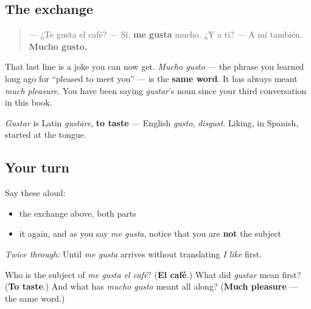 \subsection*{The exchange}
\begin{quote}
— ¿Te gusta el café? — Sí, \textbf{me gusta} mucho. ¿Y a ti? — A mí también. \textbf{Mucho gusto.}
\end{quote}

That last line is a joke you can now get. \emph{Mucho gusto} — the phrase you learned long ago for \textquotedblleft{}pleased to meet you\textquotedblright{} — is the \textbf{same word}. It has always meant \emph{much pleasure}. You have been saying \emph{gustar}'s noun since your third conversation in this book.

\begin{grammarlens}[title={What you've built}]
\emph{Gustar} is Latin \emph{gustāre}, \textbf{to taste} — English \emph{gusto}, \emph{disgust}. Liking, in Spanish, started at the tongue.
\end{grammarlens}

\subsection*{Your turn}
Say these aloud:

\begin{itemize}
\raggedright
  \item the exchange above, both parts
  \item it again, and as you say \emph{me gusta}, notice that you are \textbf{not} the subject
\end{itemize}

\emph{Twice through:} Until \emph{me gusta} arrives without translating \emph{I like} first.

\begin{tcolorbox}[breakable,colback=teal!4,colframe=teal!35!black,title={Before you move on}]
Who is the subject of \emph{me gusta el café}? (\textbf{El café}.) What did \emph{gustar} mean first? (\textbf{To taste}.) And what has \emph{mucho gusto} meant all along? (\textbf{Much pleasure} — the same word.)
\end{tcolorbox}
